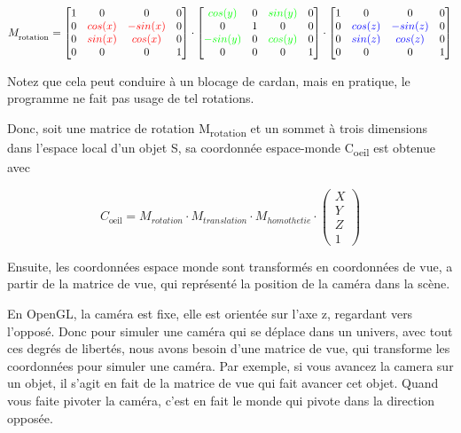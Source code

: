 \documentclass[pdftex, 11pt, a4paper, titlepage]{article}
\begin{document}
\begin{equation*}
  M_\textsubscript{rotation} =
  \begin{bmatrix}
    1 & 0     & 0        & 0 \\
    0 & \color{red}{cos(x)} & \color{red}{-sin(x)} & 0 \\
    0 & \color{red}{sin(x)} & \color{red}{cos(x)}  & 0 \\
    0 & 0 & 0 & 1
  \end{bmatrix}
  \cdot
  \begin{bmatrix}
    \color{green}{cos(y)}  & 0 & \color{green}{sin(y)}    & 0 \\
    0                    & 1 & 0                        & 0 \\
    \color{green}{-sin(y)} & 0 & \color{green}{cos(y)}    & 0 \\
    0 & 0 & 0 & 1
  \end{bmatrix}
  \cdot
  \begin{bmatrix}
    1 & 0      & 0       & 0 \\
    0 & \color{blue}{cos(z)} & \color{blue}{-sin(z)} & 0 \\
    0 & \color{blue}{sin(z)} & \color{blue}{cos(z)}  & 0 \\
    0 & 0 & 0 & 1
  \end{bmatrix}
\end{equation*}

Notez que cela peut conduire à un blocage de cardan, mais en pratique,
le programme ne fait pas usage de tel rotations.

Donc, soit une matrice de rotation M\textsubscript{rotation} et un
sommet à trois dimensions dans l'espace local d'un objet S, sa
coordonnée espace-monde C\textsubscript{oeil} est obtenue avec

\begin{equation*}
  C_\text{oeil} = M_{rotation} \cdot M_{translation} \cdot M_{homothetie} \cdot
  \begin{pmatrix}
    X \\
    Y \\
    Z \\
    1
  \end{pmatrix}
\end{equation*}

Ensuite, les coordonnées espace monde sont transformés en coordonnées
de vue, a partir de la matrice de vue, qui représenté la position de
la caméra dans la scène.

En OpenGL, la caméra est fixe, elle est orientée sur l'axe z,
regardant vers l'opposé. Donc pour simuler une caméra qui se déplace
dans un univers, avec tout ces degrés de libertés, nous avons besoin
d'une matrice de vue, qui transforme les coordonnées pour simuler une
caméra.  Par exemple, si vous avancez la camera sur un objet, il 
s'agit en fait de la matrice de vue qui fait avancer cet objet.
Quand vous faite pivoter la caméra, c'est en fait le monde qui pivote
dans la direction opposée.
\end{document}
